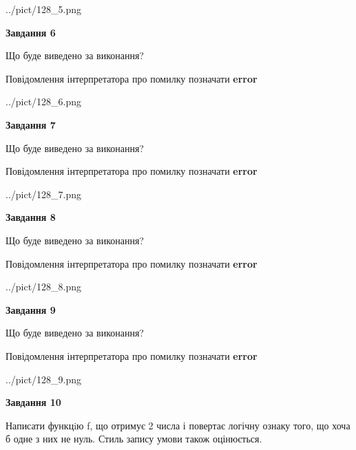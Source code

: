 \documentclass[12pt, ukrainian]{article}
\begin{document}
{\begin {large}
\begin{center}
	{../pict/128_5.png}
\end{center}
\newpage

{\begin {center}\textbf{Завдання 6}\end {center}}\par
Що буде виведено за виконання? \par
Повідомлення інтерпретатора про помилку позначати \textbf{error}

\begin{center}
	{../pict/128_6.png}
\end{center}
\newpage

{\begin {center}\textbf{Завдання 7}\end {center}}\par
Що буде виведено за виконання? \par
Повідомлення інтерпретатора про помилку позначати \textbf{error}

\begin{center}
	{../pict/128_7.png}
\end{center}
\newpage

{\begin {center}\textbf{Завдання 8}\end {center}}\par
Що буде виведено за виконання? \par
Повідомлення інтерпретатора про помилку позначати \textbf{error}

\begin{center}
	{../pict/128_8.png}
\end{center}
\newpage

{\begin {center}\textbf{Завдання 9}\end {center}}\par
Що буде виведено за виконання? \par
Повідомлення інтерпретатора про помилку позначати \textbf{error}

\begin{center}
	{../pict/128_9.png}
\end{center}
\newpage

{\begin {center}\textbf{Завдання 10}\end {center}}\par

Написати функцiю f, що отримує 2 числа і повертає логічну ознаку того, що хоча б одне з них не нуль. Стиль запису умови також оцінюється.\par
\newpage

\end {large}}
\end{document}
